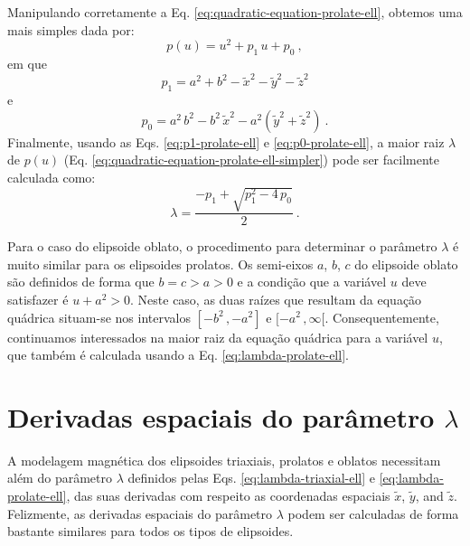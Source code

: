 Manipulando corretamente a Eq. \ref{eq:quadratic-equation-prolate-ell}, obtemos uma mais simples dada por:
\begin{equation}
p(u) =  u^{2} + p_{1} \, u + p_{0} \: ,
\label{eq:quadratic-equation-prolate-ell-simpler}
\end{equation}
em que
\begin{equation}
p_{1} = a^{2} + b^{2} - \tilde{x}^{2} - \tilde{y}^{2} - \tilde{z}^{2}
\label{eq:p1-prolate-ell}
\end{equation}
e
\begin{equation}
p_{0} =  a^{2} \, b^{2} 
- b^{2} \, \tilde{x}^{2} 
- a^{2} \left( \tilde{y}^{2} + \tilde{z}^{2} \right) \: .
\label{eq:p0-prolate-ell}
\end{equation}
Finalmente, usando as Eqs. \ref{eq:p1-prolate-ell} e
\ref{eq:p0-prolate-ell}, a maior raiz $\lambda$ de $p(u)$ 
(Eq. \ref{eq:quadratic-equation-prolate-ell-simpler}) pode ser 
facilmente calculada como:
\begin{equation}
\lambda = \frac{-p_{1} + \sqrt{p_{1}^{2} - 4 \, p_{0}}}{2} \: .
\label{eq:lambda-prolate-ell}
\end{equation}

Para o caso do elipsoide oblato, o procedimento para determinar o parâmetro
$\lambda$ é muito similar para os elipsoides prolatos. Os semi-eixos $a$, $b$, $c$
do elipsoide oblato são definidos de forma que $b = c > a > 0$ e a condição que a variável $u$
deve satisfazer é $u + a^{2} > 0$. Neste caso, as duas raízes que resultam da equação quádrica situam-se
nos intervalos $[ -b^{2} \, , -a^{2} ]$ e $[ -a^{2} \, , \infty [$. Consequentemente, continuamos interessados 
na maior raiz da equação quádrica para a variável $u$, que também é calculada usando a Eq. \ref{eq:lambda-prolate-ell}.

\section{Derivadas espaciais do parâmetro $\lambda$}

A modelagem magnética dos elipsoides triaxiais, prolatos e oblatos necessitam além do parâmetro
$\lambda$ definidos pelas Eqs. \ref{eq:lambda-triaxial-ell} e \ref{eq:lambda-prolate-ell}, das suas derivadas
com respeito as coordenadas espaciais $\tilde{x}$, $\tilde{y}$, and $\tilde{z}$.
Felizmente, as derivadas espaciais do parâmetro $\lambda$ podem ser calculadas de forma bastante
similares para todos os tipos de elipsoides.

